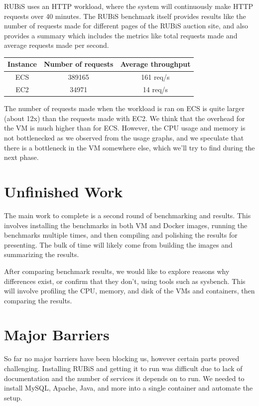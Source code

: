 \documentclass[11pt]{article}
\begin{document}
RUBiS uses an HTTP workload, where the system will continuously make HTTP requests over 40 minutes. The RUBiS benchmark itself provides results like the number of requests made for different pages of the RUBiS auction site, and also provides a summary which includes the metrics like total requests made and average requests made per second. 


\begin{center}

 \begin{tabular}{||c c c ||} 
 \hline
 Instance & Number of requests & Average throughput  \\ [0.5ex] 
 \hline\hline
 ECS & 389165 & 161 req/s  \\ 
 \hline
 EC2 & 34971 & 14 req/s \\ [1ex] 
 \hline
\end{tabular}
\end{center}

The number of requests made when the workload is ran on ECS is quite larger (about 12x) than the requests made with EC2. We think that the overhead for the VM is much higher than for ECS. However, the CPU usage and memory is not bottlenecked as we observed from the usage graphs, and we speculate that there is a bottleneck in the VM somewhere else, which we'll try to find during the next phase.

\section{Unfinished Work}

The main work to complete is a second round of benchmarking and results. This involves installing the benchmarks in both VM and Docker images, running the benchmarks multiple times, and then compiling and polishing the results for presenting. The bulk of time will likely come from building the images and summarizing the results.

After comparing benchmark results, we would like to explore reasons why differences exist, or confirm that they don't, using tools such as sysbench. This will involve profiling the CPU, memory, and disk of the VMs and containers, then comparing the results.

\section{Major Barriers}

So far no major barriers have been blocking us, however certain parts proved challenging. Installing RUBiS and getting it to run was difficult due to lack of documentation and the number of services it depends on to run. We needed to install MySQL, Apache, Java, and more into a single container and automate the setup.
\end{document}
